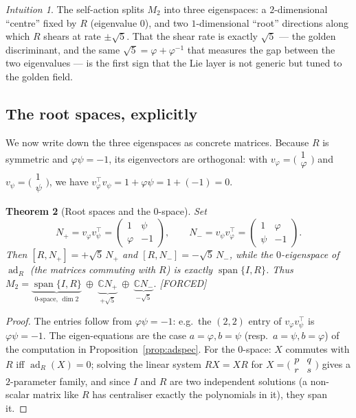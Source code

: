 \documentclass[11pt]{article}
\theoremstyle{plain}
\newtheorem{theorem}{Theorem}[section]
\theoremstyle{definition}
\theoremstyle{remark}
\newtheorem{intuition}[theorem]{Intuition}
\newcommand{\Forced}{\textcolor{forcedc}{[FORCED]}}
\newcommand{\ad}{\operatorname{ad}}
\begin{document}
\begin{intuition}
The self-action splits $M_2$ into three eigenspaces: a $2$-dimensional ``centre'' fixed by $R$ (eigenvalue $0$), and two $1$-dimensional ``root'' directions along which $R$ shears at rate $\pm\sqrt5$. That the shear rate is exactly $\sqrt5$ --- the golden discriminant, and the same $\sqrt5=φ+φ^{-1}$ that measures the gap between the two eigenvalues --- is the first sign that the Lie layer is not generic but tuned to the golden field.
\end{intuition}

\subsection{The root spaces, explicitly}
We now write down the three eigenspaces as concrete matrices. Because $R$ is symmetric and $φψ=-1$, its eigenvectors are orthogonal: with $v_φ=\bigl(\begin{smallmatrix}1\\φ\end{smallmatrix}\bigr)$ and $v_ψ=\bigl(\begin{smallmatrix}1\\ψ\end{smallmatrix}\bigr)$, we have $v_φ^{\!\top}v_ψ=1+φψ=1+(-1)=0$.

\begin{theorem}[Root spaces and the $0$-space]\label{thm:rootspaces}
Set
\[
N_{+}=v_φ v_ψ^{\!\top}=\begin{pmatrix}1&ψ\\ φ&-1\end{pmatrix},\qquad
N_{-}=v_ψ v_φ^{\!\top}=\begin{pmatrix}1&φ\\ ψ&-1\end{pmatrix}.
\]
Then $[R,N_{+}]=+\sqrt5\,N_{+}$ and $[R,N_{-}]=-\sqrt5\,N_{-}$, while the $0$-eigenspace of $\ad_R$ (the matrices commuting with $R$) is exactly $\operatorname{span}\{I,R\}$. Thus $M_2=\underbrace{\operatorname{span}\{I,R\}}_{\text{$0$-space, }\dim 2}\ \oplus\ \underbrace{ℂ N_{+}}_{+\sqrt5}\ \oplus\ \underbrace{ℂ N_{-}}_{-\sqrt5}.$ \Forced
\end{theorem}
\begin{proof}
The entries follow from $φψ=-1$: e.g.\ the $(2,2)$ entry of $v_φv_ψ^{\!\top}$ is $φψ=-1$. The eigen-equations are the case $a=φ,b=ψ$ (resp.\ $a=ψ,b=φ$) of the computation in Proposition~\ref{prop:adspec}. For the $0$-space: $X$ commutes with $R$ iff $\ad_R(X)=0$; solving the linear system $RX=XR$ for $X=\bigl(\begin{smallmatrix}p&q\\ r&s\end{smallmatrix}\bigr)$ gives a $2$-parameter family, and since $I$ and $R$ are two independent solutions (a non-scalar matrix like $R$ has centraliser exactly the polynomials in it), they span it.
\end{proof}
\end{document}
